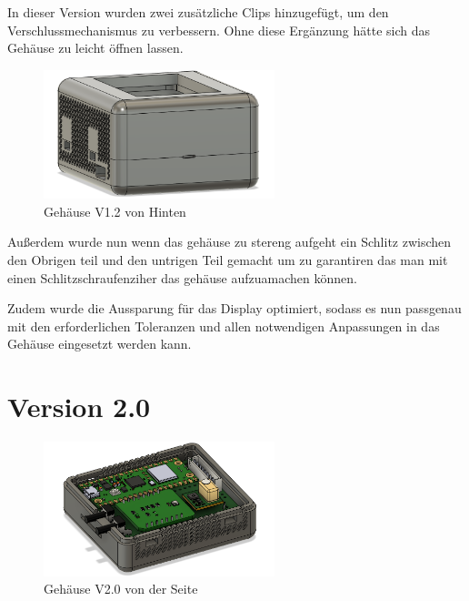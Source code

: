 \begin{inhalt}
In dieser Version wurden zwei zusätzliche Clips hinzugefügt, um den Verschlussmechanismus zu verbessern.  
Ohne diese Ergänzung hätte sich das Gehäuse zu leicht öffnen lassen.

\vspace{1cm}

\begin{figure}[!htb]
\centering
\includegraphics[width=0.6\textwidth]{files/Thomas/pics/geheause/1.2/gehaeuse_back.png}
\caption[Gehäuse V1.2 von Hinten]{Gehäuse V1.2 von Hinten}
\label{fig:gehaeuse_internet_bild}
\end{figure}

Außerdem wurde nun wenn das gehäuse zu stereng aufgeht ein Schlitz zwischen den Obrigen teil und den untrigen Teil gemacht um zu garantiren das man mit einen Schlitzschraufenziher das gehäuse aufzuamachen können.

\vspace{0.15cm}

Zudem wurde die Aussparung für das Display optimiert, sodass es nun passgenau mit den erforderlichen Toleranzen und allen notwendigen Anpassungen in das Gehäuse eingesetzt werden kann.

\newpage

\section{Version 2.0}

\begin{figure}[!htb]
\centering
\includegraphics[width=0.6\textwidth]{files/Thomas/pics/geheause/2.0/gehaeuse_side.png}
\caption[Gehäuse V2.0 von der Seite]{Gehäuse V2.0 von der Seite}
\label{fig:gehaeuse_internet_bild}
\end{figure}


\end{inhalt}
